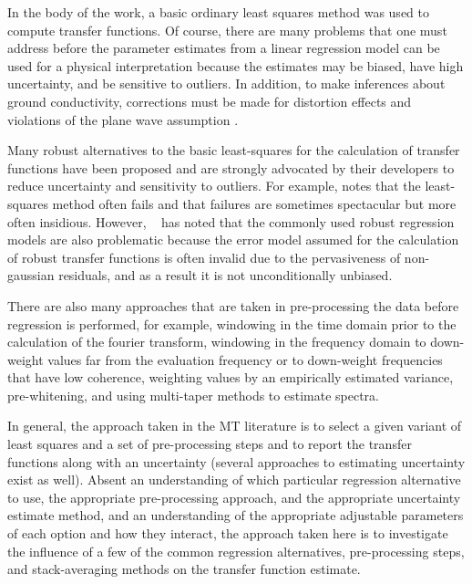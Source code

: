 \documentclass[draft,linenumbers]{agujournal2018}
\begin{document}

In the body of the work, a basic ordinary least squares method was used to compute transfer functions. Of course, there are many problems that one must address before the parameter estimates from a linear regression model can be used for a physical interpretation because the estimates may be biased, have high uncertainty, and be sensitive to outliers. In addition, to make inferences about ground conductivity, corrections must be made for distortion effects and violations of the plane wave assumption \citep{Simpson2005}.

Many robust alternatives to the basic least-squares for the calculation of transfer functions have been proposed and are strongly advocated by their developers to reduce uncertainty and sensitivity to outliers. For example, \cite{Egbert2011} notes that the least-squares method often fails and \cite{Chave1987} that failures are sometimes spectacular but more often insidious. However, ~\cite{Chave2017} has noted that the commonly used robust regression models are also problematic because the error model assumed for the calculation of robust transfer functions is often invalid due to the pervasiveness of non-gaussian residuals, and as a result it is not unconditionally unbiased.

There are also many approaches that are taken in pre-processing the data before regression is performed, for example, windowing in the time domain prior to the calculation of the fourier transform, windowing in the frequency domain to down-weight values far from the evaluation frequency or to down-weight frequencies that have low coherence, weighting values by an empirically estimated variance, pre-whitening, and using multi-taper methods to estimate spectra.

In general, the approach taken in the MT literature is to select a given variant of least squares and a set of pre-processing steps and to report the transfer functions along with an uncertainty (several approaches to estimating uncertainty exist as well). Absent an understanding of which particular regression alternative to use, the appropriate pre-processing approach, and the appropriate uncertainty estimate method, and an understanding of the appropriate adjustable parameters of each option and how they interact, the approach taken here is to investigate the influence of a few of the common regression alternatives, pre-processing steps, and stack-averaging methods on the transfer function estimate. 
\end{document}
